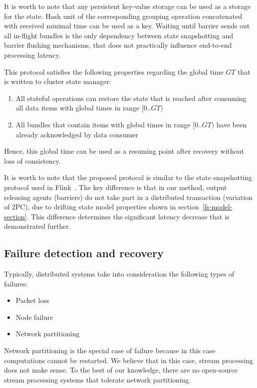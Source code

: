 It is worth to note that any persistent key-value storage can be used as a storage for the state. Hash unit of the corresponding grouping operation concatenated with received minimal time can be used as a key. Waiting until barrier sends out all in-flight bundles is the only dependency between state snapshotting and barrier flushing mechanisms, that does not practically influence end-to-end processing latency. 

This protocol satisfies the following properties regarding the global time $GT$ that is written to cluster state manager:
\begin{enumerate}
    \item All stateful operations can restore the state that is reached after consuming all data items with global times in range $[0..GT)$ 
    \item All bundles that contain items with global times in range $[0..GT)$ have been already acknowledged by data consumer 
\end{enumerate}

Hence, this global time can be used as a resuming point after recovery without loss of consistency.

It is worth to note that the proposed protocol is similar to the state snapshotting protocol used in Flink~\cite{Carbone:2017:SMA:3137765.3137777}. The key difference is that in our method, output releasing agents (barriers) do not take part in a distributed transaction (variation of 2PC), due to drifting state model properties shown in section~\ref{fs-model-section}. This difference determines the significant latency decrease that is demonstrated further.

\subsection{Failure detection and recovery}

Typically, distributed systems take into consideration the following types of failures:
\begin{itemize}
    \item Packet loss
    \item Node failure
    \item Network partitioning
\end{itemize}

Network partitioning is the special case of failure because in this case computations cannot be restarted. We believe that in this case, stream processing does not make sense. To the best of our knowledge, there are no open-source stream processing systems that tolerate network partitioning.

